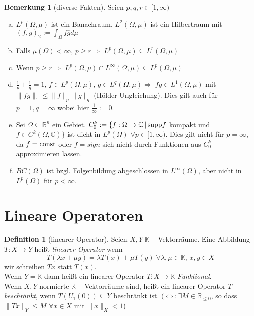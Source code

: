 \documentclass[ngerman]{report}
\theoremstyle{plain}%
\theoremstyle{definition}%
\newtheorem{definition}[thm]{Definition}
\theoremstyle{myStyle}
\newtheorem{bem}[thm]{Bemerkung}
\newcommand{\C}{\mathbb{C}}
\newcommand{\R}{\mathbb{R}}
\newcommand{\pR}{\mathbb{R}_{\leq 0}} %
\newcommand{\K}{\mathbb{K}}
\newcommand{\supp}{\textnormal{supp}}
\newcommand{\norm}[1]{\|#1\|}
\begin{document}
\begin{bem}[diverse Fakten]
	Seien $p,q,r\in [1,\infty)$
	\begin{enumerate}[(a)]
		\item $L^p(\Omega,\mu)$ ist ein Banachraum, $L^2(\Omega,\mu)$ ist ein Hilbertraum mit $(f,g)_2 := \int_\Omega f \overline{g} d\mu$
		
		\item Falls $\mu(\Omega) < \infty,\, p\geq r \Rightarrow\; L^p(\Omega,\mu)\subseteq L^r(\Omega,\mu)$
		
		\item Wenn $p\geq r\Rightarrow\; L^p(\Omega,\mu)\cap L^\infty(\Omega,\mu)\subseteq L^p(\Omega,\mu)$
		
		\item $\frac{1}{p}+\frac{1}{q}=1,\,f\in L^p(\Omega,\mu),\,g\in L^q(\Omega,\mu)\Rightarrow\;fg\in 		 L^1(\Omega,\mu)$ mit $\norm{fg}_1\leq\norm{f}_p\norm{g}_q$ (Hölder-Ungleichung). Dies gilt auch für $p=1, q=\infty$ wobei \underline{hier} $\frac{1}{\infty}:=0$.
		
		\item Sei $\Omega\subseteq \R^n$ ein Gebiet. $C^k_0:=\{f:\Omega \rightarrow \C\,|\, \supp f$ kompakt und $f\in C^k(\Omega,\C)\}$ ist dicht in $L^p(\Omega)\;\forall p\in[1,\infty)$. Dies gilt nicht für $p=\infty$, da $f=\textnormal{const}$ oder $f=sign$ sich nicht durch Funktionen aus $C^k_0$ approximieren lassen.
		
		\item $BC(\Omega)$ ist bzgl. Folgenbildung abgeschlossen in $L^\infty (\Omega)$, aber nicht in $L^p(\Omega)$ für $p<\infty$.
	\end{enumerate}
\end{bem}



\section{Lineare Operatoren}%

	\begin{definition}[linearer Operator]
		Seien $X,Y\; \K-$Vektorräume. Eine Abbildung $T:X\rightarrow Y$ heißt \textit{linearer Operator} wenn 
		$$T(\lambda x+\mu y) = \lambda T(x) + \mu T(y)\;\forall \lambda,\mu \in \K,\,x,y\in X$$ 
		wir schreiben $Tx$ statt $T(x)$.\\
		Wenn $Y=\K$ dann heißt ein linearer Operator $T:X\rightarrow \K$\textit{ Funktional}.\\
		Wenn $X,Y$ normierte $\K-$Vektorräume sind, heißt ein linearer Operator $T$ \textit{beschränkt}, wenn $T(U_1(0)) \subseteq Y$ beschränkt ist. 
		$(\Leftrightarrow: \exists M \in \pR$, so dass $\norm{Tx}_Y \leq M$ $\forall x\in X$ mit $\norm{x}_X < 1$)
	\end{definition}
\end{document}

